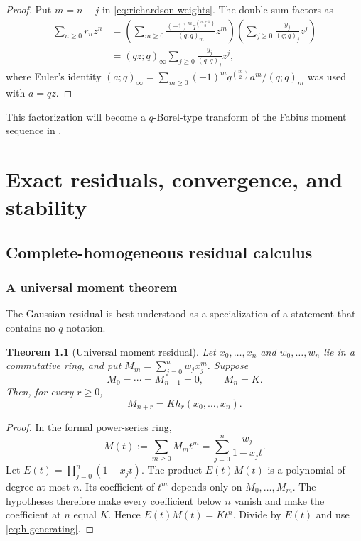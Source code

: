\documentclass[11pt,oneside]{book}
\numberwithin{equation}{chapter}
\newtheorem{theorem}{Theorem}[chapter]
\theoremstyle{definition}
\theoremstyle{remark}
\begin{document}
\begin{proof}
Put $m=n-j$ in \eqref{eq:richardson-weights}.  The double sum factors as
\begin{align*}
 \sum_{n\ge0}r_nz^n
 &=\left(\sum_{m\ge0}
   \frac{(-1)^mq^{\binom{m+1}{2}}}{(q;q)_m}z^m\right)
   \left(\sum_{j\ge0}\frac{y_j}{(q;q)_j}z^j\right)\\
 &=(qz;q)_\infty
   \sum_{j\ge0}\frac{y_j}{(q;q)_j}z^j,
\end{align*}
where Euler's identity
$(a;q)_\infty=\sum_{m\ge0}(-1)^mq^{\binom m2}a^m/(q;q)_m$
was used with $a=qz$.
\end{proof}

This factorization will become a $q$-Borel-type transform of the Fabius
moment sequence in .

\part{Exact residuals, convergence, and stability}

\chapter{Complete-homogeneous residual calculus}
\label{chap:residuals}

\section{A universal moment theorem}

The Gaussian residual is best understood as a specialization of a statement
that contains no $q$-notation.

\begin{theorem}[Universal moment residual]
\label{thm:universal-moment-residual}
Let $x_0,\ldots,x_n$ and $w_0,\ldots,w_n$ lie in a commutative ring, and put
$M_m=\sum_{j=0}^nw_jx_j^m$.  Suppose
\begin{equation}
 M_0=\cdots=M_{n-1}=0,
 \qquad M_n=K.
 \label{eq:moment-residual-hypothesis}
\end{equation}
Then, for every $r\ge0$,
\begin{equation}
 M_{n+r}=K h_r(x_0,\ldots,x_n).
 \label{eq:universal-moment-residual}
\end{equation}
\end{theorem}

\begin{proof}
In the formal power-series ring,
\[
 M(t):=\sum_{m\ge0}M_mt^m
 =\sum_{j=0}^n\frac{w_j}{1-x_jt}.
\]
Let $E(t)=\prod_{j=0}^n(1-x_jt)$.  The product $E(t)M(t)$ is a polynomial of
degree at most $n$.  Its coefficient of $t^m$ depends only on
$M_0,\ldots,M_m$.  The hypotheses therefore make every coefficient below
$n$ vanish and make the coefficient at $n$ equal $K$.  Hence
$E(t)M(t)=Kt^n$.  Divide by $E(t)$ and use
\eqref{eq:h-generating}.
\end{proof}
\end{document}

